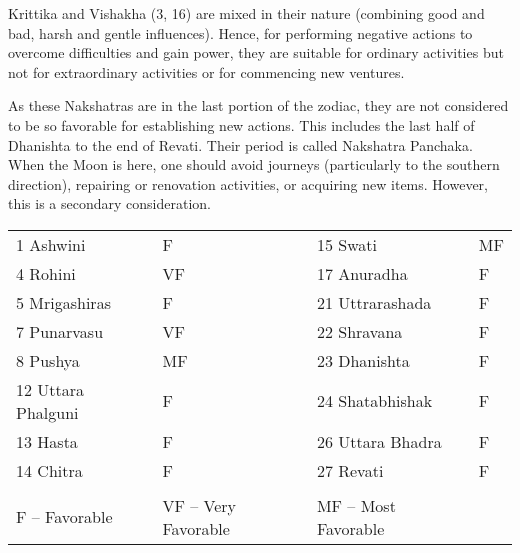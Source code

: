  


Krittika and Vishakha (3, 16) are mixed in their nature (combining good and bad, harsh and gentle influences). Hence, for performing negative actions to overcome difficulties and gain power, they are suitable for ordinary activities but not for extraordinary activities or for commencing new ventures.

 


As these Nakshatras are in the last portion of the zodiac, they are not considered to be so favorable for establishing new actions. This includes the last half of Dhanishta to the end of Revati. Their period is called Nakshatra Panchaka. When the Moon is here, one should avoid journeys (particularly to the southern direction), repairing or renovation activities, or acquiring new items. However, this is a secondary consideration.

 

 
\begin{center}
\begin{tabular}{ l l l l}
1  Ashwini                  &F                  & 15  Swati                   & MF                                  \\

4  Rohini                    &VF                 &  17  Anuradha           &   F                                  \\

5  Mrigashiras            &F                 &  21  Uttrarashada         & F                                  \\

7  Punarvasu              &VF              &     22  Shravana              &  F                                  \\

8  Pushya                   &MF              &   23  Dhanishta             &F                                  \\

12  Uttara Phalguni      & F              &    24  Shatabhishak        & F                                  \\

13  Hasta                      &F                &  26  Uttara Bhadra         &F                                  \\

14  Chitra                      &F                &  27  Revati                     & F                                  \\

 &&&                                  \\

F  –  Favorable              & VF  –  Very Favorable           &  MF  –  Most Favorable                                  \\

   \end{tabular}
\end{center}


